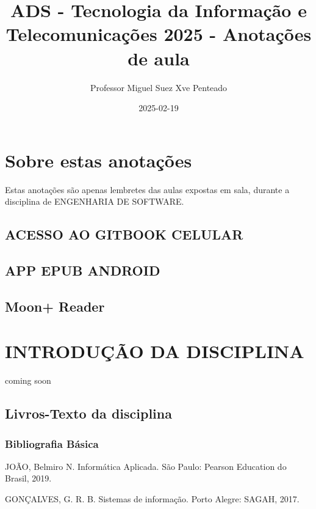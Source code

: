 \documentclass[
]{book}
\title{ADS - Tecnologia da Informação e Telecomunicações 2025 - Anotações de aula}
\author{Professor Miguel Suez Xve Penteado}
\date{2025-02-19}
\begin{document}
\maketitle

{
\setcounter{tocdepth}{1}
\tableofcontents
}
\chapter*{Sobre estas anotações}\label{sobre-estas-anotauxe7uxf5es}

Estas anotações são apenas lembretes das aulas expostas em sala, durante a disciplina de ENGENHARIA DE SOFTWARE.

\section{ACESSO AO GITBOOK CELULAR}\label{acesso-ao-gitbook-celular}

\section{APP EPUB ANDROID}\label{app-epub-android}

\section{\texorpdfstring{\textbf{Moon+ Reader}}{Moon+ Reader}}\label{moon-reader}

\chapter*{INTRODUÇÃO DA DISCIPLINA}\label{introduuxe7uxe3o-da-disciplina}

coming soon

\section{Livros-Texto da disciplina}\label{livros-texto-da-disciplina}

\subsection{Bibliografia Básica}\label{bibliografia-buxe1sica}

JOÃO, Belmiro N. Informática Aplicada. São Paulo: Pearson Education do Brasil, 2019.

GONÇALVES, G. R. B. Sistemas de informação. Porto Alegre: SAGAH, 2017.
\end{document}
